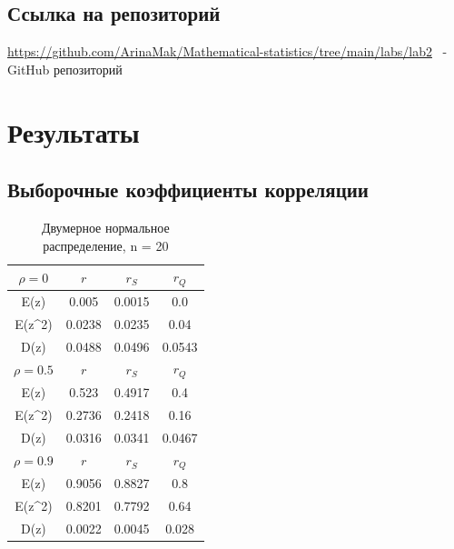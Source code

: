 \documentclass[a4paper]{article}
\begin{document}
\subsection{Ссылка на репозиторий}
		\url{https://github.com/ArinaMak/Mathematical-statistics/tree/main/labs/lab2} \ - GitHub репозиторий
	
    
\section{Результаты}
\subsection{Выборочные коэффициенты корреляции}
	\begin{table}[H]
		\centering
		\begin{tabular}{| c | c | c | c |}
			
			\hline
			$\rho = 0$ & $r$      & $r_S$  & $r_Q$ \\
			\hline
			E(z)    & 0.005 & 0.0015 & 0.0  \\
            E(z\^{}2)  & 0.0238 & 0.0235 & 0.04  \\
            D(z)    & 0.0488 & 0.0496 & 0.0543 \\
			\hline
			$\rho = 0.5$ & $r$      & $r_S$  & $r_Q$ \\
			\hline
			E(z)      & 0.523 & 0.4917 & 0.4   \\
            E(z\^{}2)    & 0.2736 & 0.2418 & 0.16  \\
            D(z)      & 0.0316 & 0.0341 & 0.0467 \\
			\hline
			$\rho = 0.9$ & $r$      & $r_S$  & $r_Q$ \\
			\hline
			E(z)      & 0.9056 & 0.8827 & 0.8   \\
            E(z\^{}2)    & 0.8201 & 0.7792 & 0.64  \\
            D(z)      & 0.0022 & 0.0045 & 0.028 \\
			\hline
			
		\end{tabular}{}
		\caption{Двумерное нормальное распределение, n = 20}
		\label{tab:n20}
	\end{table}
	
\end{document}
